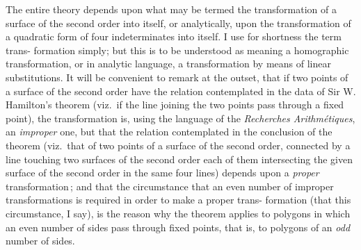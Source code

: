 \documentclass[11pt,a4paper]{book}
\begin{document}
\bigskip

The entire theory depends upon what may be termed the transformation of a
surface of the second order into itself, or analytically, upon the transformation of a
quadratic form of four indeterminates into itself. I use for shortness the term trans-
formation simply; but this is to be understood as meaning a homographic transformation,
or in analytic language, a transformation by means of linear substitutions. It will
be convenient to remark at the outset, that if two points of a surface of the second
order have the relation contemplated in the data of Sir W. Hamilton's theorem (viz.\
if the line joining the two points pass through a fixed point), the transformation is,
using the language of the \textit{Recherches Arithm\'etiques}, an \textit{improper} one, but that the
relation contemplated in the conclusion of the theorem (viz.\ that of two points of a
surface of the second order, connected by a line touching two surfaces of the second
order each of them intersecting the given surface of the second order in the same
four lines) depends upon a \textit{proper} transformation\,; and that the circumstance that an
even number of improper transformations is required in order to make a proper trans-
formation (that this circumstance, I say), is the reason why the theorem applies to
polygons in which an even number of sides pass through fixed points, that is, to
polygons of an \textit{odd} number of sides.

\medskip
\end{document}
